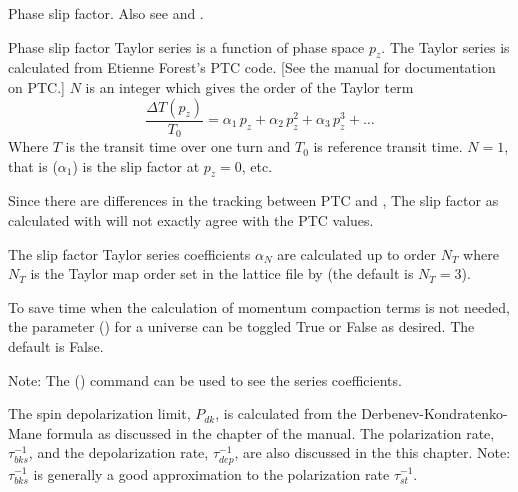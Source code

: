 \begin{description}
{  %
  \item[slip_factor_ptc.$N$, $N = 1, 2, 3, \ldots$] \Newline {}
Phase slip factor. Also see  and .

Phase slip factor Taylor series is a function of phase space $p_z$. The Taylor series is calculated
from Etienne Forest's PTC code. [See the \bmad manual for documentation on PTC.] $N$ is an integer
which gives the order of the Taylor term
\begin{equation}
  \frac{\Delta T(p_z)}{T_0} = \alpha_1 \, p_z + \alpha_2 \, p_z^2 + \alpha_3 \, p_z^3 + \ldots
\end{equation}
Where $T$ is the transit time over one turn and $T_0$ is reference transit time.
$N = 1$, that is  ($\alpha_1$) is the slip factor at $p_z = 0$, etc.

Since there are differences in the tracking between PTC and \bmad, The slip factor as calculated
with \bmad will not exactly agree with the PTC values.

The slip factor Taylor series coefficients $\alpha_N$ are calculated up to order $N_T$ where $N_T$ is the
Taylor map order set in the lattice file by  (the default is $N_T=3$). 

To save time when the calculation of momentum compaction terms is not needed, the  parameter
() for a universe can be toggled True or False as desired. The default is False.

Note: The  () command can be used to see the series coefficients.

  \item[spin.polarization_limit, .polarization_rate, .depolarization_rate] \Newline {}
The spin depolarization limit, $P_{dk}$, is calculated from the Derbenev-Kondratenko-Mane formula as
discussed in the  chapter of the \bmad manual.  The 
polarization rate, $\tau_{bks}^{-1}$, and the depolarization rate, $\tau_{dep}^{-1}$, are also
discussed in the this chapter. Note: $\tau_{bks}^{-1}$ is generally a good approximation to the
 polarization rate $\tau_{st}^{-1}$.

}
\end{description}
